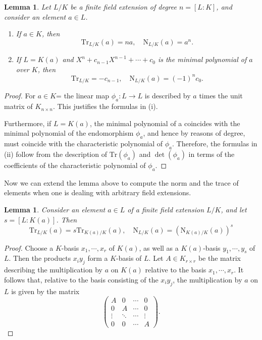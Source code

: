 \documentclass[12pt]{report}
\newtheorem{lemma}[thm]{Lemma}
\theoremstyle{definition}
\def\Tr{\text{Tr}}
\def\nm{\text{N}}
\def\aa{\alpha}
\begin{document}
\begin{lemma}
    Let $L/K$ be a finite field extension of degree $n = [L : K]$, and consider an element $a \in L$.
\begin{enumerate}
    \item If $a \in K$, then
    $$\Tr_{L/K}(a) = na,\quad \nm_{L/K}(a) = a^n.$$
    \item If $L = K(a)$ and $X^n + c_{n-1}X^{n-1} +\cdots + c_0$ is the minimal polynomial of $a$ over $K$, then
    $$\Tr_{L/K}=-c_{n-1},\quad \nm_{L/K}(a)=(-1)^nc_0.$$
\end{enumerate}
\end{lemma}

\begin{proof}
    For $a \in K$= the linear map $\phi_a : L \to L$ is described by $a$ times the unit matrix of $K_{n\times n}$. This justifies the formulas in (i). 
    
    
    Furthermore, if $L = K(a)$, the minimal polynomial of a coincides with the minimal polynomial of the endomorphism $\phi_a$, and hence by reasons of degree, must coincide with the characteristic polynomial of $\phi_a$. Therefore, the formulas in (ii) follow from the description of $\Tr(\phi_a)$ and $\det(\phi_a)$ in terms of the coefficients of the characteristic polynomial of $\phi_a$.
\end{proof}


Now we can extend the lemma above to compute the norm and the trace of elements when one is dealing with arbitrary field extensions.

\begin{lemma}
    Consider an element $a \in L$ of a finite field extension $L/K$, and let $s = [L : K(a)]$. Then $$\Tr_{L/K}(a)=s\Tr_{K(a)/K}(a),\quad \nm_{L/K}(a)=(\nm_{K(a)/K}(a))^s$$
\end{lemma}

\begin{proof}
    Choose a $K$-basis $x_1, \cdots , x_r$ of $K(a)$, as well as a $K(a)$-basis $y_1, \cdots , y_s$ of $L$. Then the products $x_iy_j$ form a $K$-basis of $L$. Let $A \in K_{r\times r}$ be the matrix describing the multiplication by $a$ on $K(a)$ relative to the basis $x_1, \cdots , x_r$. It follows that, relative to the basis consisting of the $x_iy_j$, the multiplication by $a$ on $L$ is given by the matrix
    $$\begin{pmatrix}
       A &0 &\cdots & 0\\
       0 & A &\cdots & 0\\
      \vdots & \ddots & \cdots  & \vdots\\
       0 &0 &\cdots & A
    \end{pmatrix}.$$
\end{proof}
\end{document}
